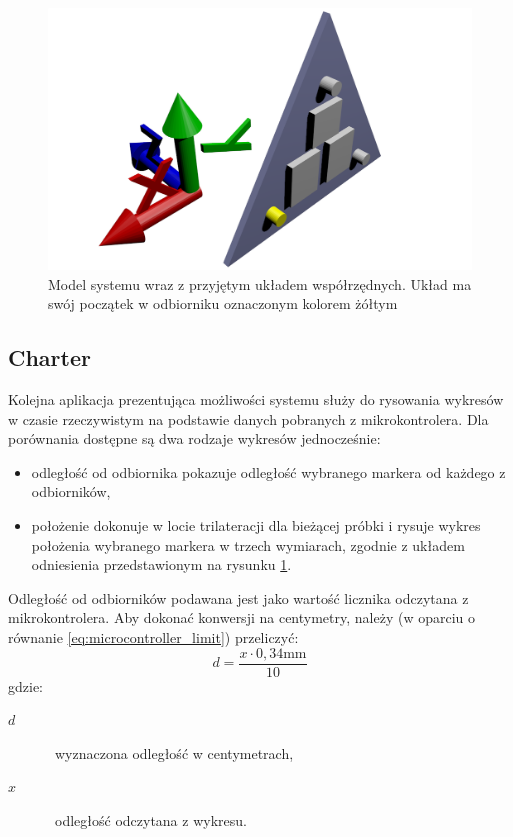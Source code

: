 \begin{figure}
 \includegraphics[width=\textwidth]{gfx/uklad_render.png}
 \caption[Model systemu i przyjęty układ współrzędnych]{Model systemu wraz z przyjętym układem współrzędnych. Układ ma swój początek w odbiorniku oznaczonym kolorem żółtym}
 \label{fig:coordinate_system}
\end{figure}

\subsection{Charter}
Kolejna aplikacja prezentująca możliwości systemu służy do rysowania wykresów w czasie rzeczywistym na podstawie danych pobranych z mikrokontrolera. Dla porównania dostępne są dwa rodzaje wykresów jednocześnie:
\begin{itemize}
 \item odległość od odbiornika \ppauza pokazuje odległość wybranego markera od każdego z odbiorników,
 \item położenie \ppauza dokonuje w locie trilateracji dla bieżącej próbki i rysuje wykres położenia wybranego markera w trzech wymiarach, zgodnie z układem odniesienia przedstawionym na rysunku \ref{fig:coordinate_system}.
\end{itemize}

Odległość od odbiorników podawana jest jako wartość licznika odczytana z mikrokontrolera. Aby dokonać konwersji na centymetry, należy (w oparciu o równanie \ref{eq:microcontroller_limit}) przeliczyć:
\begin{equation}
 d = \frac{x \cdot 0,34\textrm{mm}}{10}
\end{equation}
gdzie:
\begin{description}
 \item[$d$] \ppauza~wyznaczona odległość w centymetrach,
 \item[$x$] \ppauza~odległość odczytana z wykresu.
\end{description}

